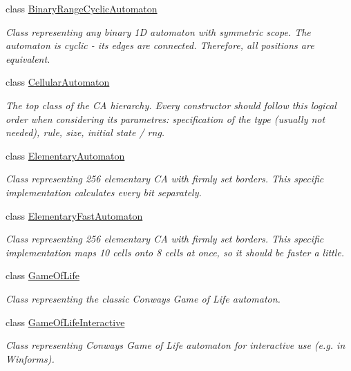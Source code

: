 \begin{DoxyCompactItemize}
class \hyperlink{class_cellular_1_1_binary_range_cyclic_automaton}{Binary\+Range\+Cyclic\+Automaton}
\begin{DoxyCompactList}\small\item\em Class representing any binary 1\+D automaton with symmetric scope. The automaton is cyclic -\/ its edges are connected. Therefore, all positions are equivalent. \end{DoxyCompactList}\item 
class \hyperlink{class_cellular_1_1_cellular_automaton}{Cellular\+Automaton}
\begin{DoxyCompactList}\small\item\em The top class of the C\+A hierarchy. Every constructor should follow this logical order when considering its parametres\+: specification of the type (usually not needed), rule, size, initial state / rng. \end{DoxyCompactList}\item 
class \hyperlink{class_cellular_1_1_elementary_automaton}{Elementary\+Automaton}
\begin{DoxyCompactList}\small\item\em Class representing 256 elementary C\+A with firmly set borders. This specific implementation calculates every bit separately. \end{DoxyCompactList}\item 
class \hyperlink{class_cellular_1_1_elementary_fast_automaton}{Elementary\+Fast\+Automaton}
\begin{DoxyCompactList}\small\item\em Class representing 256 elementary C\+A with firmly set borders. This specific implementation maps 10 cells onto 8 cells at once, so it should be faster a little. \end{DoxyCompactList}\item 
class \hyperlink{class_cellular_1_1_game_of_life}{Game\+Of\+Life}
\begin{DoxyCompactList}\small\item\em Class representing the classic Conway\textquotesingle{}s Game of Life automaton. \end{DoxyCompactList}\item 
class \hyperlink{class_cellular_1_1_game_of_life_interactive}{Game\+Of\+Life\+Interactive}
\begin{DoxyCompactList}\small\item\em Class representing Conway\textquotesingle{}s Game of Life automaton for interactive use (e.\+g. in Winforms). \end{DoxyCompactList}\item 

\end{DoxyCompactItemize}
